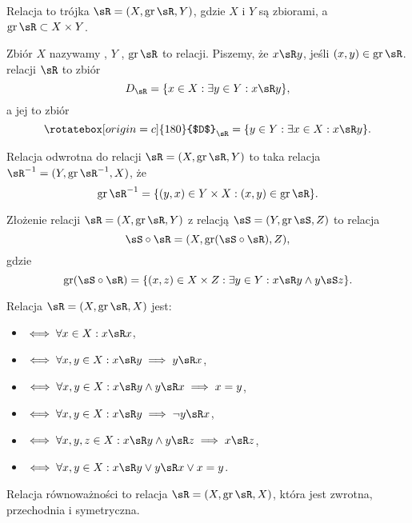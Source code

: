 \begin{definition}
    Relacja to trójka $\sR = (X, \gr\sR, Y)$, gdzie $X$ i $Y$ są zbiorami, a $\gr \sR \subset X \times Y$.
\end{definition}

Zbiór $X$ nazywamy , $Y$ , $\gr \sR$ to  relacji. Piszemy, że $x \sR y$, jeśli $(x, y) \in \gr\sR$.  relacji $\sR$ to zbiór
$$ D_\sR = \{x \in X : \exists y \in Y : x \sR y\}, $$
a jej  to zbiór
$$ \rotatebox[origin=c]{180}{$D$}_\sR = \{y \in Y : \exists x \in X : x \sR y\}. $$

\begin{definition}
    Relacja odwrotna do relacji $\sR = (X, \gr\sR, Y)$ to taka relacja $\sR^{-1} = (Y, \gr\sR^{-1}, X)$, że
    $$ \gr \sR^{-1} = \{(y, x) \in Y \times X : (x, y) \in \gr\sR\}. $$
\end{definition}

\begin{definition}
    Złożenie relacji $\sR = (X, \gr\sR, Y)$ z relacją $\sS = (Y, \gr\sS, Z)$ to relacja
    $$ \sS \circ \sR = (X, \gr(\sS \circ \sR), Z), $$
    gdzie
    $$ \gr(\sS \circ \sR) = \{(x, z) \in X \times Z : \exists y \in Y : x \sR y \wedge y \sS z\}. $$
\end{definition}

\begin{definition}
    Relacja $\sR = (X, \gr\sR, X)$ jest:
    \begin{itemize}
        \item {} $\iff \forall x\in X : x \sR x$,
        \item {} $\iff \forall x, y \in X : x \sR y \implies y \sR x$,
        \item {} $\iff \forall x, y \in X : x \sR y \wedge y \sR x \implies x = y$,
        \item {} $\iff \forall x, y \in X : x \sR y \implies \neg y \sR x$,
        \item {} $\iff \forall x, y, z \in X : x \sR y \wedge y \sR z \implies x \sR z$,
        \item {} $\iff \forall x, y \in X : x \sR y \vee y \sR x \vee x = y$.
    \end{itemize}
\end{definition}

\begin{definition}
    Relacja równoważności to relacja $\sR = (X, \gr\sR, X)$, która jest zwrotna, przechodnia i symetryczna.
\end{definition}

